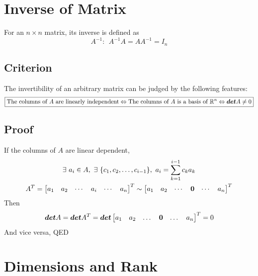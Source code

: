 \documentclass[11pt]{article}
\begin{document}
\section{Inverse of Matrix}
For an $n \times n$ matrix, its inverse is defined as
\begin{equation}
    A^{-1}:~~A^{-1}A = AA^{-1} = I_n
\end{equation}
\subsection{Criterion}
The invertibility of an arbitrary matrix can be judged by the following features:
\begin{equation}
    \boxed{\text{The columns of $A$ are linearly independent} \Leftrightarrow \text{The columns of $A$ is a basis of  $\mathbb{R}^n$} \Leftrightarrow \bm{det}A \neq 0} \notag
\end{equation}
\subsection{Proof}
If the columns of $A$ are linear dependent,
\begin{gather}
    \exists~a_i \in A,~\exists~\{c_1, c_2, \dots, c_{i-1}\},~a_i = \sum_{k=1}^{i-1}c_k a_k \notag \\
    A^{T} = \begin{bmatrix}
    a_1 & a_2 & \cdots & a_i & \cdots & a_n 
    \end{bmatrix}^{T} \sim
    \begin{bmatrix}
    a_1 & a_2 & \cdots & \bm{0} & \cdots & a_n
    \end{bmatrix}^{T} \notag
\end{gather}
Then
\begin{equation}
    \bm{det}A = \bm{det}A^{T}=\bm{det}\begin{bmatrix}
    a_1 & a_2 & \dots & \bm{0} & \dots & a_n
    \end{bmatrix}^{T} = 0 \notag
\end{equation}
And vice versa, QED
\section{Dimensions and Rank}
\end{document}
